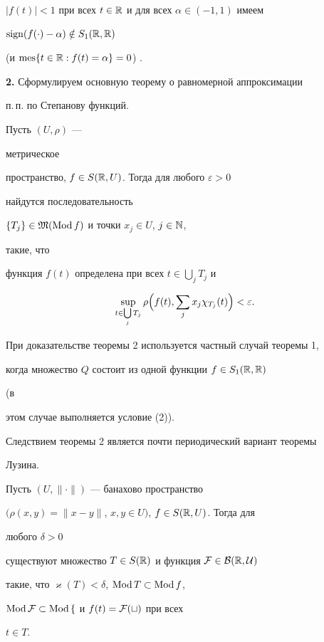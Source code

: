 $|f(t)|<1$ при всех $t\in \Bbb R$ и для всех $\alpha\in(-1,1)$ имеем


$\operatorname{sign}(f(\cdot)-\alpha)\notin S_1(\Bbb R,\Bbb R)$


(и $\operatorname{mes}\{t\in\Bbb R:f(t)=\alpha\}=0$) \cite{4}.


\medskip





{\bf 2.} Сформулируем основную теорему о равномерной аппроксимации


п.\,п. по Степанову функций.





\begin{thm} Пусть $(U,\rho)$ ---


метрическое


пространство, $f\in S(\Bbb R,U)$. Тогда для любого $\varepsilon>0$


найдутся последовательность


$\{T_j\}\in\frak M(\operatorname{Mod} f)$ и точки $x_j\in U$, $j\in\Bbb N$,


такие, что


функция $f(t)$ определена при всех $t\in\bigcup\limits_j T_j$ и


$$


\sup_{t\in\bigcup\limits_j T_j}\rho\Bigl(f(t),\sum_j x_j


\chi_{T_j}(t)\Bigr)<\varepsilon.


$$


\end{thm}





При доказательстве теоремы 2 используется частный случай теоремы 1,


когда множество $Q$ состоит из одной функции $f\in S_1(\Bbb R,\Bbb R)$


(в


этом случае выполняется условие (2)).





Следствием теоремы 2 является почти периодический вариант теоремы


Лузина.





\begin{thm}


Пусть $(U,\|\cdot\|)$ --- банахово пространство


$(\rho(x,y)=\|x-y\|$, $x,y\in U)$, $f\in S(\Bbb R,U)$. Тогда для


любого $\delta>0$


существуют множество $T\in S(\Bbb R)$ и функция $\cal F\in B(\Bbb R,U)$


такие, что $\varkappa(T)<\delta$, $\operatorname{Mod} T\subset \operatorname{Mod} f$,


$\operatorname{Mod} \cal F\subset \operatorname{Mod} f$ и $f(t)=\cal F(t)$ при всех


$t\in T$.


\end{thm}





